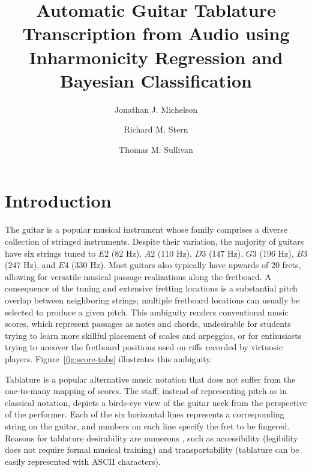 \documentclass[convention,peer-reviewed]{aesconf}
\title{Automatic Guitar Tablature Transcription from Audio using Inharmonicity Regression
and Bayesian Classification}
\author[1]{Jonathan J. Michelson}
\author[2]{Richard M. Stern}
\author[2]{Thomas M. Sullivan}
\affil[1]{New Sensor Corporation / Electro-Harmonix}
\affil[2]{Department of Electrical and Computer Engineering, and School of Music, Carnegie Mellon University}
\begin{document}
\setlength{\parindent}{1em}


\section{Introduction}
The guitar is a popular musical instrument whose family comprises a diverse collection of stringed instruments. Despite their variation, the majority of guitars have six strings tuned to $E2$ ($82$ Hz), $A2$ ($110$ Hz), $D3$ ($147$ Hz), $G3$ ($196$ Hz), $B3$ ($247$ Hz), and $E4$ ($330$ Hz). Most guitars also typically have upwards of 20 frets, allowing for versatile musical passage realizations along the fretboard. A consequence of the tuning and extensive fretting locations is  a substantial pitch overlap between neighboring strings; multiple fretboard locations can usually be selected to produce a given pitch. This ambiguity renders conventional music scores, which represent passages as notes and chords, undesirable for students trying to learn more skillful placement of scales and arpeggios, or for enthusiasts trying to uncover the fretboard positions used on riffs recorded by virtuosic players. Figure~\ref{fig:score-tabs} illustrates this ambiguity.  

Tablature is a popular alternative music notation that does not suffer from the one-to-many mapping of scores. The staff, instead of representing pitch as in classical notation, depicts a birds-eye view of the guitar neck from the perspective of the performer. Each of the six horizontal lines represents a corresponding string on the guitar, and numbers on each line specify the fret to be fingered. Reasons for tablature desirability are numerous \citep{macrae2010}, such as accessibility (legibility does not require formal musical training) and transportability (tablature can be easily represented with ASCII characters). 
\end{document}
